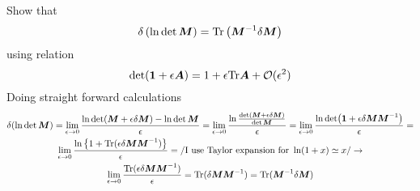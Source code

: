 \problem

Show that
%
\begin{equation}
    \delta \left(\ln \det \boldsymbol{M} \right) = \text{Tr}\left(\boldsymbol{M}^{-1}\delta \boldsymbol{M}\right)
    \label{eq:ass6_sol2}
\end{equation}
%
using relation
%
\begin{equation}
    \det(\boldsymbol{1}+\epsilon \boldsymbol{A}) = 
    1 + \epsilon\text{Tr}\boldsymbol{A} + \mathcal{O}(\epsilon^2)
\end{equation}
%
Doing straight forward calculations 
%
\begin{multline}
    \delta(\ln \det \boldsymbol{M}) = 
    \lim_{\epsilon\to0}\frac{\ln \det(\boldsymbol{M}+\epsilon\delta\boldsymbol{M}) - \ln \det \boldsymbol{M}}{\epsilon} =
    \lim_{\epsilon\to0}\frac{\ln \frac{\det(\boldsymbol{M}+\epsilon\delta\boldsymbol{M})}{\det \boldsymbol{M}}}{\epsilon} =
    \lim_{\epsilon\to0}\frac{\ln \det (\boldsymbol{1}+ \epsilon\delta\boldsymbol{M}\boldsymbol{M}^{-1})}{\epsilon} = \\
    \lim_{\epsilon\to0}\frac{\ln \left\{1 + \text{Tr} (\epsilon\delta\boldsymbol{M}\boldsymbol{M}^{-1})\right\}}{\epsilon} =
    /\text{I use Taylor expansion for } \ln(1+x) \simeq x/ \rightarrow \\
    \lim_{\epsilon\to0}\frac{\text{Tr}(\epsilon\delta\boldsymbol{M}\boldsymbol{M}^{-1})}{\epsilon} = 
    \text{Tr} (\delta\boldsymbol{M}\boldsymbol{M}^{-1})= 
    \text{Tr} (\boldsymbol{M}^{-1}\delta\boldsymbol{M})
\end{multline}

